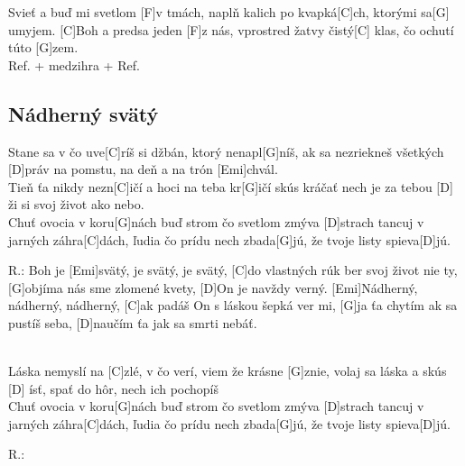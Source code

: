 \documentclass[10pt]{article}
\begin{document}
\begin{Large}
\begin{minipage}{\textwidth}
\begin{multicols}{2}
\begin{guitar}
	[C]Svieť a buď mi svetlom [F]v tmách,
	naplň kalich po kvapká[C]ch,
	ktorými sa[G] umyjem.
	[C]Boh a predsa jeden [F]z nás,
	vprostred žatvy čistý[C] klas,
	čo ochutí túto [G]zem.
	\\
	Ref. + medzihra + Ref.
\end{guitar}
\end{multicols}
\end{minipage}

\begin{minipage}{\textwidth}
\subsection{Nádherný svätý}
\begin{multicols}{2}
\begin{guitar}
	[Emi]Stane sa v čo uve[C]ríš
	si džbán, ktorý nenapl[G]níš,
	ak sa nezriekneš všetkých [D]práv
	na pomstu, na deň a na trón [Emi]chvál.
	\\
	Tieň ťa nikdy nezn[C]ičí
	a hoci na teba kr[G]ičí
	skús kráčať nech je za tebou
	[D] ži si svoj život ako nebo.
	\\
	[C]Chuť ovocia v koru[G]nách
	buď strom čo svetlom zmýva [D]strach
	tancuj v jarných záhra[C]dách,
	ľudia čo prídu nech zbada[G]jú, 
	že tvoje listy spieva[D]jú.
	\\
	\begin{minipage}{\textwidth}
	R.: Boh je [Emi]svätý, je svätý, je svätý,
	[C]do vlastných rúk ber svoj život nie ty,
	[G]objíma nás sme zlomené kvety,
	[D]On je navždy verný.
	[Emi]Nádherný, nádherný, nádherný,
	[C]ak padáš On s láskou šepká ver mi,
	[G]ja ťa chytím ak sa pustíš seba,
	[D]naučím ťa jak sa smrti nebáť.
\end{minipage}
	\\
	[Emi]Láska nemyslí na [C]zlé,
	v čo verí, viem že krásne [G]znie,
	volaj sa láska a skús [D] ísť,
	spať do hôr, nech ich pochopíš
	\\
	[C]Chuť ovocia v koru[G]nách
	buď strom čo svetlom zmýva [D]strach
	tancuj v jarných záhra[C]dách,
	ľudia čo prídu nech zbada[G]jú, 
	že tvoje listy spieva[D]jú.
	
	R.:
\end{guitar}
\end{multicols}
\end{minipage}


\begin{minipage}{\textwidth}

\end{minipage}
\end{Large}
\end{document}
